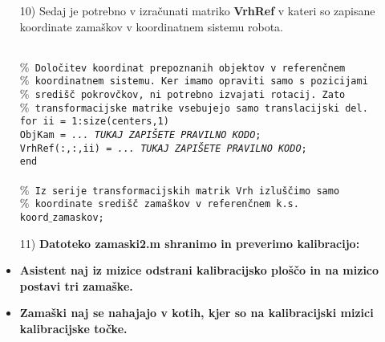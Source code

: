 \begin{enumerate}
\normalsize %
\item[10)]  Sedaj je potrebno v izračunati matriko \textbf{VrhRef} v kateri so zapisane koordinate zamaškov v koordinatnem sistemu robota. %

~\\
\textcolor[rgb]{0.50,0.50,0.50}{\texttt{$\%$ Določitev koordinat prepoznanih objektov v referenčnem}} \\%
\textcolor[rgb]{0.50,0.50,0.50}{\texttt{$\%$ koordinatnem sistemu. Ker imamo opraviti samo s pozicijami}} \\%
\textcolor[rgb]{0.50,0.50,0.50}{\texttt{$\%$ središč pokrovčkov, ni potrebno izvajati rotacij. Zato}} \\%
\textcolor[rgb]{0.50,0.50,0.50}{\texttt{$\%$ transformacijske matrike vsebujejo samo translacijski del.}} \\%
\texttt{for ii = 1:size(centers,1)} \\ %
\hspace*{0.2 cm}\texttt{ObjKam = \emph{... TUKAJ ZAPIŠETE PRAVILNO KODO};} \\ %
\hspace*{0.2 cm}\texttt{VrhRef(:,:,ii) = \emph{... TUKAJ ZAPIŠETE PRAVILNO KODO};} \\ %
\texttt{end} \\ %
\\
\textcolor[rgb]{0.50,0.50,0.50}{\texttt{$\%$ Iz serije transformacijskih matrik Vrh izluščimo samo}} \\%
\textcolor[rgb]{0.50,0.50,0.50}{\texttt{$\%$ koordinate središč zamaškov v referenčnem k.s.}} \\%
\texttt{koord$\_$zamaskov;} \\ %

\normalsize %
\item[11)]  \textbf{Datoteko zamaski2.m shranimo in preverimo kalibracijo:} %

\end{enumerate}
\normalsize

\begin{mdframed}[backgroundcolor=red!20, shadow=true,roundcorner=8pt]
\begin{itemize}
  \item \textbf{Asistent naj iz mizice odstrani kalibracijsko ploščo in na mizico postavi tri zamaške.}
  \item \textbf{Zamaški naj se nahajajo v kotih, kjer so na kalibracijski mizici kalibracijske točke.}
\end{itemize}
\end{mdframed}

